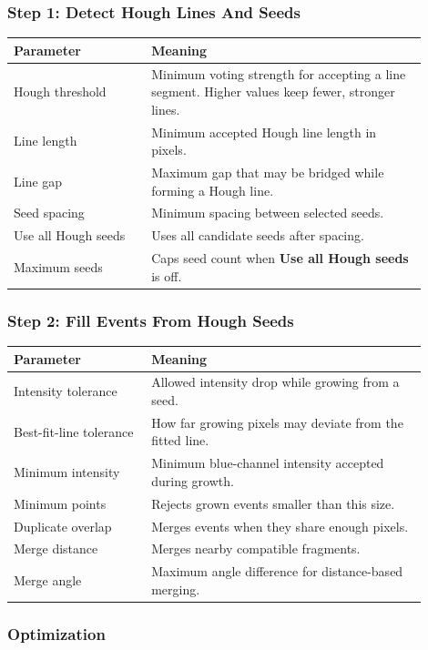 \documentclass[11pt]{article}
\newcommand{\ui}[1]{\textbf{#1}}
\begin{document}
\subsubsection{Step 1: Detect Hough Lines And Seeds}

\begin{longtable}{p{0.3\linewidth}p{0.6\linewidth}}
\toprule
\textbf{Parameter} & \textbf{Meaning} \\
\midrule
Hough threshold & Minimum voting strength for accepting a line segment. Higher values keep fewer, stronger lines. \\
Line length & Minimum accepted Hough line length in pixels. \\
Line gap & Maximum gap that may be bridged while forming a Hough line. \\
Seed spacing & Minimum spacing between selected seeds. \\
Use all Hough seeds & Uses all candidate seeds after spacing. \\
Maximum seeds & Caps seed count when \ui{Use all Hough seeds} is off. \\
\bottomrule
\end{longtable}

\subsubsection{Step 2: Fill Events From Hough Seeds}

\begin{longtable}{p{0.3\linewidth}p{0.6\linewidth}}
\toprule
\textbf{Parameter} & \textbf{Meaning} \\
\midrule
Intensity tolerance & Allowed intensity drop while growing from a seed. \\
Best-fit-line tolerance & How far growing pixels may deviate from the fitted line. \\
Minimum intensity & Minimum blue-channel intensity accepted during growth. \\
Minimum points & Rejects grown events smaller than this size. \\
Duplicate overlap & Merges events when they share enough pixels. \\
Merge distance & Merges nearby compatible fragments. \\
Merge angle & Maximum angle difference for distance-based merging. \\
\bottomrule
\end{longtable}

\subsubsection{Optimization}
\end{document}
